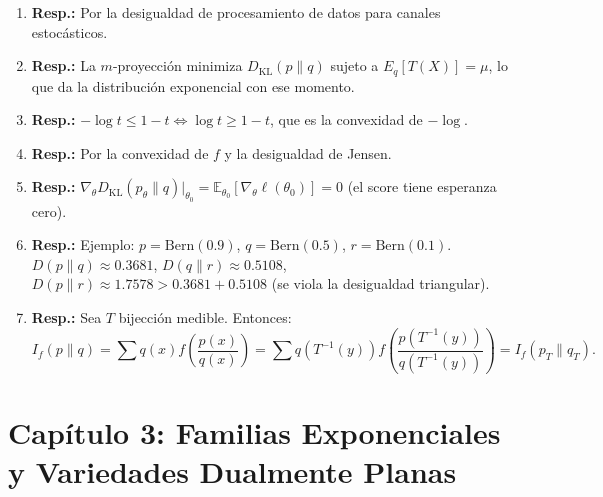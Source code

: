 \begin{enumerate}
	\item \textbf{Resp.:} Por la desigualdad de procesamiento de datos para canales estocásticos.
	\item \textbf{Resp.:} La $m$-proyección minimiza $D_{\mathrm{KL}}(p \| q)$ sujeto a $E_q[T(X)] = \mu$, lo que da la distribución exponencial con ese momento.
	\item \textbf{Resp.:} $-\log t \le 1 - t \iff \log t \ge 1 - t$, que es la convexidad de $-\log$.
	\item \textbf{Resp.:} Por la convexidad de $f$ y la desigualdad de Jensen.
	\item \textbf{Resp.:} $\nabla_\theta D_{\mathrm{KL}}(p_\theta \| q)\big|_{\theta_0} = \mathbb{E}_{\theta_0}[\nabla_\theta \ell(\theta_0)] = 0$ (el score tiene esperanza cero).
	\item \textbf{Resp.:} Ejemplo: $p = \mathrm{Bern}(0.9)$, $q = \mathrm{Bern}(0.5)$, $r = \mathrm{Bern}(0.1)$.  $D(p \| q) \approx 0.3681$, $D(q \| r) \approx 0.5108$, $D(p \| r) \approx 1.7578 > 0.3681 + 0.5108$ (se viola la desigualdad triangular).
	\item \textbf{Resp.:} Sea $T$ bijección medible.  Entonces:
	\[
	I_f(p \| q) = \sum q(x) f\!\left(\frac{p(x)}{q(x)}\right) = \sum q(T^{-1}(y)) f\!\left(\frac{p(T^{-1}(y))}{q(T^{-1}(y))}\right) = I_f(p_T \| q_T).
	\]
\end{enumerate}

\section*{Capítulo 3: Familias Exponenciales y Variedades Dualmente Planas}

